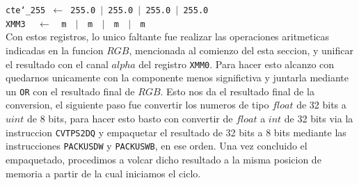 \noindent
\texttt{cte\char`_255 $\gets$ 255.0 $\vert$ 255.0 $\vert$ 255.0 $\vert$ 255.0}\\
\texttt{XMM3 $\ \ \ \gets\ \ $ m $\ \ \vert\ \ $ m $\ \ \vert\ \ $ m $\ \ \vert\ \ $ m}\\

Con estos registros, lo unico faltante fue realizar las operaciones aritmeticas indicadas en la funcion $RGB$, mencionada al comienzo del esta seccion, y unificar el resultado con el canal $alpha$ del registro \texttt{XMM0}. Para hacer esto alcanzo con quedarnos unicamente con la componente menos significtiva y juntarla mediante un \texttt{OR} con el resultado final de $RGB$. Esto nos da el resultado final de la conversion, el siguiente paso fue convertir los numeros de tipo $float$ de 32 bits a $uint$ de 8 bits, para hacer esto basto con convertir de $float$ a $int$ de 32 bits via la instruccion \texttt{CVTPS2DQ} y empaquetar el resultado de 32 bits a 8 bits mediante las instrucciones \texttt{PACKUSDW} y \texttt{PACKUSWB}, en ese orden. Una vez concluido el empaquetado, procedimos a volcar dicho resultado a la misma posicion de memoria a partir de la cual iniciamos el ciclo.